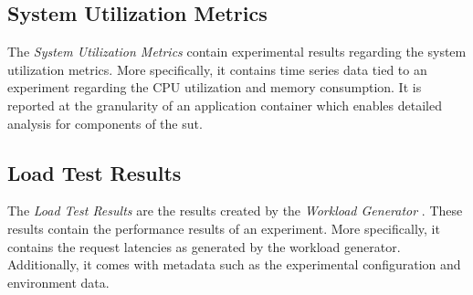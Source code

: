 \subsection{System Utilization Metrics}
The \textit{System Utilization Metrics}  contain experimental results regarding the system utilization metrics. More specifically, it contains time series data tied to an experiment regarding the CPU utilization and memory consumption. It is reported at the granularity of an application container which enables detailed analysis for components of the \gls{sut}.

\subsection{Load Test Results}
The \textit{Load Test Results}  are the results created by the \textit{Workload Generator} . These results contain the performance results of an experiment. More specifically, it contains the request latencies as generated by the workload generator. Additionally, it comes with metadata  such as the experimental configuration and environment data. 
